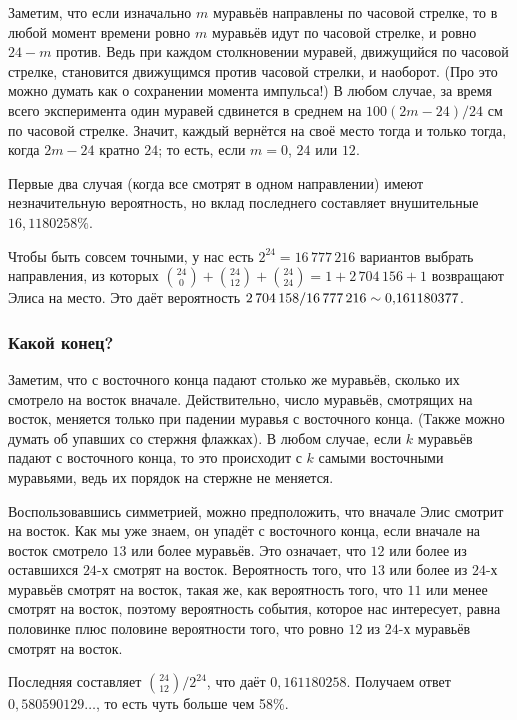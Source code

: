 Заметим, что если изначально $m$ муравьёв направлены по часовой стрелке, то в любой момент времени ровно $m$ муравьёв идут по часовой стрелке, и ровно $24 - m$ против.
Ведь при каждом столкновении муравей, движущийся по часовой стрелке, становится движущимся против часовой стрелки, и наоборот.
(Про это можно думать как о сохранении момента импульса!)
В любом случае, за время всего эксперимента один муравей сдвинется в среднем на $100(2m - 24)/24$ см по часовой стрелке.
Значит, каждый вернётся на своё место тогда и только тогда, когда $2m - 24$ кратно $24$; то есть, если $m = 0$, $24$ или $12$.

Первые два случая (когда все смотрят в одном направлении) имеют незначительную вероятность, но вклад последнего составляет внушительные $16{,}1180258\%$. %

Чтобы быть совсем точными, у нас есть $2^{24}=16\,777\,216$ вариантов выбрать направления, из которых  $\binom{24}0+\binom{24}{12}+\binom{24}{24}=1+2\,704\,156+1$ возвращают Элиса на место.
Это даёт вероятность $2\,704\,158/16\,777\,216 \z\sim 0{,}161180377$.

\subsubsection*{Какой конец?}

Заметим, что с восточного конца падают столько же муравьёв, сколько их смотрело на восток вначале.
Действительно, число муравьёв, смотрящих на восток, меняется только при падении муравья с восточного конца.
(Также можно думать об упавших со стержня флажках).
В любом случае, если $k$ муравьёв падают с восточного конца, то это происходит с $k$ самыми восточными муравьями, ведь их порядок на стержне не меняется.

Воспользовавшись симметрией, можно предположить, что вначале Элис смотрит на восток.
Как мы уже знаем, он упадёт с восточного конца, если вначале на восток смотрело $13$ или более муравьёв.
Это означает, что $12$ или более из оставшихся $24$-х смотрят на восток.
Вероятность того, что $13$ или более из $24$-х муравьёв смотрят на восток, такая же, как вероятность того, что $11$ или менее смотрят на восток, поэтому вероятность события, которое нас интересует, равна половинке плюс половине вероятности того, что ровно $12$ из $24$-х муравьёв смотрят на восток.

Последняя составляет $\binom{24}{12}/2^{24}$, что даёт $0{,}161180258$.
Получаем ответ $0{,}580590129\dots$, то есть чуть больше чем 58\%.

